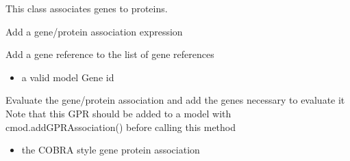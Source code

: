 \documentclass[letterpaper,10pt,english]{sphinxmanual}
\begin{document}
\begin{fulllineitems}
\label{\detokenize{modules_doc:cbmpy.CBModel.GeneProteinAssociation}}
\pysigstartsignatures
{}
\pysigstopsignatures
\sphinxAtStartPar
This class associates genes to proteins.

\begin{fulllineitems}
\label{\detokenize{modules_doc:cbmpy.CBModel.GeneProteinAssociation.addAssociation}}
\pysigstartsignatures
{}
\pysigstopsignatures
\sphinxAtStartPar
Add a gene/protein association expression

\end{fulllineitems}


\begin{fulllineitems}
\label{\detokenize{modules_doc:cbmpy.CBModel.GeneProteinAssociation.addGeneref}}
\pysigstartsignatures
{}
\pysigstopsignatures
\sphinxAtStartPar
Add a gene reference to the list of gene references
\begin{itemize}
\item {} 
\sphinxAtStartPar
{} a valid model Gene id

\end{itemize}

\end{fulllineitems}


\begin{fulllineitems}
\label{\detokenize{modules_doc:cbmpy.CBModel.GeneProteinAssociation.createAssociationAndGeneRefsFromString}}
\pysigstartsignatures
{}
\pysigstopsignatures
\sphinxAtStartPar
Evaluate the gene/protein association and add the genes necessary to evaluate it
Note that this GPR should be added to a model with cmod.addGPRAssociation() before calling this method
\begin{itemize}
\item {} 
\sphinxAtStartPar
{} the COBRA style gene protein association


\end{itemize}
\end{fulllineitems}
\end{fulllineitems}
\end{document}

